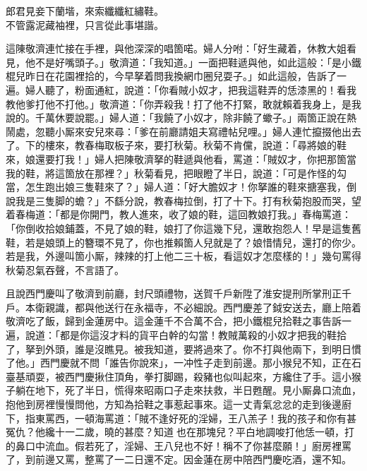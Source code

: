 \begin{myquote}
郎君見妾下蘭堦，來索纖纖紅繡鞋。\\不管露泥藏袖裡，只言從此事堪諧。
\end{myquote}

這陳敬濟連忙接在手裡，與他深深的唱箇喏。{}婦人分咐：「好生藏着，休教大姐看見，{}他不是好嘴頭子。」敬濟道：「我知道。」一面把鞋遞與他，如此這般：「是小鐵棍兒昨日在花園裡拾的，今早拏着問我換網巾圈兒耍子。」如此這般，告訴了一遍。婦人聽了，粉面通紅，說道：「你看賊小奴才，把我這鞋弄的恁漆黑的！看我教他爹打他不打他。」敬濟道：「你弄殺我！打了他不打緊，敢就賴着我身上，是我說的。千萬休要說罷。」婦人道：「我饒了小奴才，除非饒了蠍子。」兩箇正說在熱鬧處，忽聽小厮來安兒來尋：「爹在前廳請姐夫寫禮帖兒哩。」婦人連忙攛掇他出去了。下的樓來，教春梅取板子來，要打秋菊。秋菊不肯儻，說道：「尋將娘的鞋來，娘還要打我！」婦人把陳敬濟拏的鞋遞與他看，罵道：「賊奴才，你把那箇當我的鞋，將這箇放在那裡？」秋菊看見，把眼瞪了半日，說道：「可是作怪的勾當，怎生跑出娘三隻鞋來了？」婦人道：「好大膽奴才！你拏誰的鞋來搪塞我，倒說我是三隻脚的蟾？」不繇分說，教春梅拉倒，打了十下。打有秋菊抱股而哭，望着春梅道：「都是你開門，教人進來，收了娘的鞋，這回教娘打我。」{}春梅罵道：「你倒收拾娘鋪蓋，不見了娘的鞋，娘打了你這幾下兒，還敢抱怨人！早是這隻舊鞋，若是娘頭上的簪環不見了，你也推賴箇人兒就是了？{}娘惜情兒，還打的你少。若是我，外邊叫箇小厮，辣辣的打上他二三十板，看這奴才怎麼樣的！」幾句罵得秋菊忍氣吞聲，不言語了。

且說西門慶叫了敬濟到前廳，封尺頭禮物，送賀千戶新陞了淮安提刑所掌刑正千戶。本衛親識，都與他送行在永福寺，不必細說。西門慶差了鉞安送去，廳上陪着敬濟吃了飯，歸到金蓮房中。這金蓮千不合萬不合，把小鐵棍兒拾鞋之事告訴一遍，說道：「都是你這沒才料的貨平白幹的勾當！教賊萬殺的小奴才把我的鞋拾了，拏到外頭，誰是沒瞧見。被我知道，要將過來了。你不打與他兩下，到明日慣了他。」西門慶就不問「誰告你說來」，一冲性子走到前邊。那小猴兒不知，正在石臺基頑耍，被西門慶揪住頂角，拳打脚踢，殺豬也似叫起來，方纔住了手。這小猴子躺在地下，死了半日，慌得來昭兩口子走來扶救，半日甦醒。見小厮鼻口流血，抱他到房裡慢慢問他，方知為拾鞋之事惹起事來。這一丈青氣忿忿的走到後邊廚下，指東罵西，一頓海罵道：「賊不逢好死的淫婦，王八羔子！我的孩子和你有甚冤仇？他纔十一二歲，曉的甚麼？知道𣭈也在那塊兒？平白地調唆打他恁一頓，打的鼻口中流血。假若死了，淫婦、王八兒也不好！稱不了你甚麼願！」廚房裡罵了，到前邊又罵，整罵了一二日還不定。因金蓮在房中陪西門慶吃酒，還不知。

